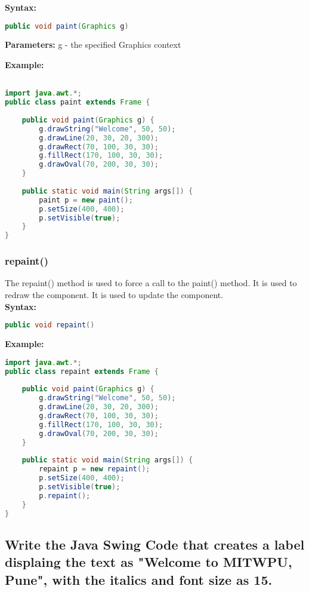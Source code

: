\documentclass[11pt]{article}
\begin{document}
\textbf{Syntax:}

\begin{lstlisting}[language=Java]
public void paint(Graphics g)
\end{lstlisting}

\textbf{Parameters:}
g - the specified Graphics context

\textbf{Example:}

\begin{lstlisting}[language=Java]

import java.awt.*;
public class paint extends Frame {
	
	public void paint(Graphics g) {
		g.drawString("Welcome", 50, 50);
		g.drawLine(20, 30, 20, 300);
		g.drawRect(70, 100, 30, 30);
		g.fillRect(170, 100, 30, 30);
		g.drawOval(70, 200, 30, 30);
	}
	
	public static void main(String args[]) {
		paint p = new paint();
		p.setSize(400, 400);
		p.setVisible(true);
	}
}
\end{lstlisting}

\subsubsection{repaint()}
The repaint() method is used to force a call to the paint() method. It is used to redraw the component. It is used to update the component.\\

\textbf{Syntax:}
\begin{lstlisting}[language=Java]
public void repaint()
\end{lstlisting}

\textbf{Example:}
\begin{lstlisting}[language=Java]
import java.awt.*;
public class repaint extends Frame {
	
	public void paint(Graphics g) {
		g.drawString("Welcome", 50, 50);
		g.drawLine(20, 30, 20, 300);
		g.drawRect(70, 100, 30, 30);
		g.fillRect(170, 100, 30, 30);
		g.drawOval(70, 200, 30, 30);
	}
	
	public static void main(String args[]) {
		repaint p = new repaint();
		p.setSize(400, 400);
		p.setVisible(true);
		p.repaint();
	}
}
\end{lstlisting}

\subsection{\textbf{Write the Java Swing Code that creates a label displaing the text as "Welcome to MITWPU, Pune", with the italics and font size as 15. }}
\end{document}

